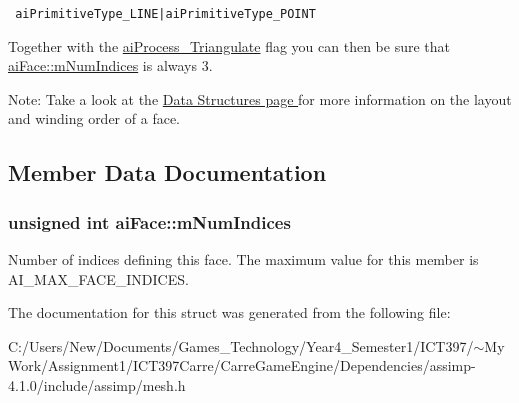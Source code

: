 \begin{Code}\begin{verbatim} aiPrimitiveType_LINE|aiPrimitiveType_POINT
\end{verbatim}
\end{Code}

 Together with the \hyperlink{postprocess_8h_64795260b95f5a4b3f3dc1be4f52e4109c3de834f0307f31fa2b1b6d05dd592b}{aiProcess\_\-Triangulate} flag you can then be sure that \hyperlink{structai_face_dda2698cec0ebfe651572f4a5701360b}{aiFace::mNumIndices} is always 3. \begin{Desc}
\item[Note:]Take a look at the \hyperlink{}{Data Structures page } for more information on the layout and winding order of a face. \end{Desc}


\subsection{Member Data Documentation}
\hypertarget{structai_face_dda2698cec0ebfe651572f4a5701360b}{
\subsubsection[mNumIndices]{\setlength{\rightskip}{0pt plus 5cm}unsigned int {\bf aiFace::mNumIndices}}}
\label{structai_face_dda2698cec0ebfe651572f4a5701360b}


Number of indices defining this face. The maximum value for this member is AI\_\-MAX\_\-FACE\_\-INDICES. 

The documentation for this struct was generated from the following file:\begin{CompactItemize}
\item 
C:/Users/New/Documents/Games\_\-Technology/Year4\_\-Semester1/ICT397/$\sim$My Work/Assignment1/ICT397Carre/CarreGameEngine/Dependencies/assimp-4.1.0/include/assimp/mesh.h\end{CompactItemize}
